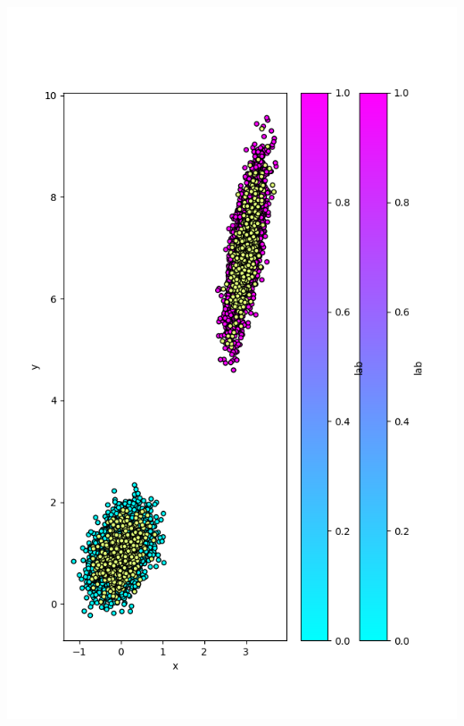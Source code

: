 \documentclass{article}
\begin{document}
\begin{enumerate}
  \noindent\includegraphics[scale=0.5]{plot_10}

\end{enumerate}
\end{document}
